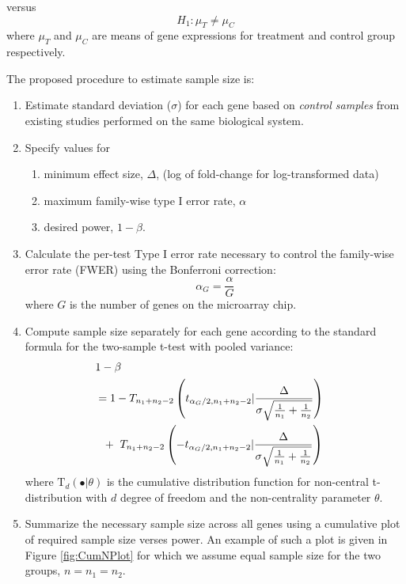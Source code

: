 \documentclass{bioinfo}
\begin{document}
versus
\begin{equation}
  H_1: \mu_{T} \neq \mu_{C} \nonumber
\end{equation}
where $\mu_{T}$ and $\mu_{C}$ are means of gene expressions for
treatment and control group respectively.

The proposed procedure to estimate sample size is:

\begin{enumerate}
\item{Estimate standard deviation ($\sigma$) for each gene based on
    \emph{control samples} from existing studies performed on the
    same biological system.}

\item{Specify values for
    \begin{enumerate}
    \item minimum effect size, $\Delta$, (log of fold-change for
          log-transformed data)
    \item maximum family-wise type I error rate, $\alpha$
    \item desired power, $1 - \beta$.
    \end{enumerate}
  }

\item{Calculate the per-test Type I error rate necessary to control
      the family-wise error rate (FWER) using the Bonferroni correction:}
\begin{equation}
  \alpha_G = \frac{\alpha}{G}
\end{equation}
%
where $G$ is the number of genes on the microarray chip.

\item{Compute sample size separately for each gene according to the
    standard formula for the two-sample t-test with pooled variance:}
  \begin{eqnarray}
    \lefteqn{1-\beta} \nonumber \\
    &= 1-T_{n_1+n_2-2} \left( t_{\alpha_G/2,n_1+n_2-2} | \frac{\Delta}{\sigma \sqrt{\frac{1}{n_1} + \frac{1}{n_2}}}\right) \nonumber \\
    &  ~~+~T_{n_1+n_2-2} \left( -t_{\alpha_G/2,n_1+n_2-2} | \frac{\Delta}{\sigma \sqrt{\frac{1}{n_1} + \frac{1}{n_2}}}\right)
    \label{eq:formula}
  \end{eqnarray}
  where $\mathrm{T}_{d}(\bullet|\theta)$ is the cumulative
  distribution function for non-central t-distribution with $d$ degree
  of freedom and the non-centrality parameter $\theta$.

\item{Summarize the necessary sample size across all genes using a
      cumulative plot of required sample size verses power. An
      example of such a plot is given in Figure \ref{fig:CumNPlot}
      for which we assume equal sample size for the two groups, $n =
      n_1 = n_2$.}

\end{enumerate}
\end{document}
